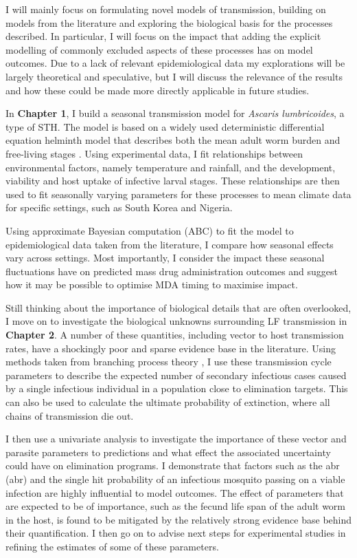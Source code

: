 I will mainly focus on formulating novel models of transmission, building on models from the literature and exploring the biological basis for the processes described. In particular, I will focus on the impact that adding the explicit modelling of commonly excluded aspects of these processes has on model outcomes. Due to a lack of relevant epidemiological data my explorations will be largely theoretical and speculative, but I will discuss the relevance of the results and how these could be made more directly applicable in future studies.

In \textbf{Chapter 1}, I build a seasonal transmission model for \textit{Ascaris lumbricoides}, a type of STH. The model is based on a widely used deterministic differential equation helminth model that describes both the mean adult worm burden and free-living stages \cite{Anderson1992}. Using experimental data, I fit relationships between environmental factors, namely temperature and rainfall, and the development, viability and host uptake of infective larval stages. These relationships are then used to fit seasonally varying parameters for these processes to mean climate data for specific settings, such as South Korea and Nigeria.

Using approximate Bayesian computation (ABC) to fit the model to epidemiological data taken from the literature, I compare how seasonal effects vary across settings. Most importantly, I consider the impact these seasonal fluctuations have on predicted mass drug administration outcomes and suggest how it may be possible to optimise MDA timing to maximise impact.

Still thinking about the importance of biological details that are often overlooked, I move on to investigate the biological unknowns surrounding LF transmission in \textbf{Chapter 2}. A number of these quantities, including vector to host transmission rates, have a shockingly poor and sparse evidence base in the literature. Using methods taken from branching process theory \cite{Watson1875}, I use these transmission cycle parameters to describe the expected number of secondary infectious cases caused by a single infectious individual in a population close to elimination targets. This can also be used to calculate the ultimate probability of extinction, where all chains of transmission die out.

I then use a univariate analysis to investigate the importance of these vector and parasite parameters to predictions and what effect the associated uncertainty could have on elimination programs. I demonstrate that factors such as the \acrlong{abr} (\acrshort{abr}) and the single hit probability of an infectious mosquito passing on a viable infection are highly influential to model outcomes. The effect of parameters that are expected to be of importance, such as the fecund life span of the adult worm in the host, is found to be mitigated by the relatively strong evidence base behind their quantification. I then go on to advise next steps for experimental studies in refining the estimates of some of these parameters.

